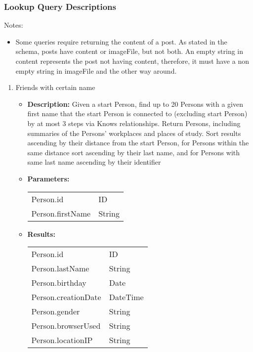 \subsubsection{Lookup Query Descriptions}
\label{sub:queries}

Notes:
\begin{itemize}
\item Some queries require returning the content of a post. As stated in the schema, posts have content or imageFile, but not both. An empty string in content represents the post not having content, therefore, it must have a non empty string in imageFile and the other way around.
\end{itemize}

{\small
\begin{enumerate}
	\item Friends with certain name
	\begin{itemize}
		\item \textbf{Description:}
            Given a start Person, find up to 20 Persons with a given first name
            that the start Person is connected to (excluding start Person) by
            at most 3 steps via Knows relationships. Return Persons, including
            summaries of the Persons’ workplaces and places of study.  Sort
            results ascending by their distance from the start Person, for
            Persons within the same distance sort ascending by their last name,
            and for Persons with same last name ascending by their identifier
		\item \textbf{Parameters:} \\
			\begin{tabular}{ll}
				Person.id 										& ID \\
				Person.firstName								& String \\
			\end{tabular}
		\item \textbf{Results:} \\
			\begin{tabular}{ll}
				Person.id 										& ID \\
				Person.lastName									& String \\
				Person.birthday 								& Date \\
				Person.creationDate 							& DateTime  \\
				Person.gender 									& String \\
				Person.browserUsed 								& String \\
				Person.locationIP 								& String \\

\end{tabular}
\end{itemize}
\end{enumerate}}
